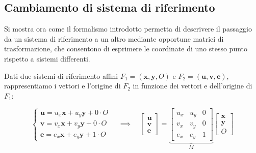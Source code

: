 \subsection{Cambiamento di sistema di riferimento}
\label{subsec:cambio_sdr}
Si mostra ora come il formalismo introdotto permetta di descrivere il passaggio da un sistema di riferimento a un altro mediante opportune matrici di trasformazione, che consentono di esprimere le coordinate di uno stesso punto rispetto a sistemi differenti.

Dati due sistemi di riferimento affini $F_1 = (\mathbf{x}, \mathbf{y}, O)$ e $F_2 = (\mathbf{u}, \mathbf{v}, \mathbf{e})$, rappresentiamo i vettori e l'origine di $F_2$ in funzione dei vettori e dell'origine di $F_1$:

\[
\begin{cases}
    \mathbf{u} = u_{x} \mathbf{x} + u_{y} \mathbf{y} + 0 \cdot O \\
    \mathbf{v} = v_{x} \mathbf{x} + v_{y} \mathbf{y} + 0 \cdot O \\
    \mathbf{e} = e_x \mathbf{x} + e_y \mathbf{y} + 1 \cdot O
\end{cases}
\quad \implies \quad
\begin{bmatrix}
    \mathbf{u} \\
    \mathbf{v} \\
    \mathbf{e}
\end{bmatrix}
=
\underbrace{
    \begin{bmatrix}
        u_x & u_y & 0 \\
        v_x & v_y & 0 \\
        e_x & e_y & 1
    \end{bmatrix}
}_{M}
\begin{bmatrix}
    \mathbf{x} \\
    \mathbf{y} \\
    O
\end{bmatrix}
\]

